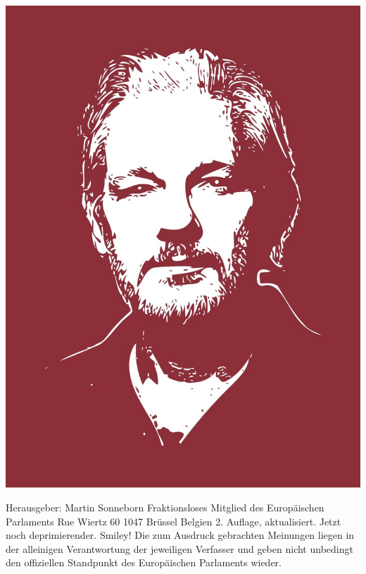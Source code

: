 \includegraphics[width=180mm]{assange.jpg}

Herausgeber:
Martin Sonneborn
Fraktionsloses Mitglied des Europäischen Parlaments
Rue Wiertz 60
1047 Brüssel
Belgien
2. Auflage, aktualisiert. Jetzt noch deprimierender. Smiley!
Die zum Ausdruck gebrachten Meinungen liegen in der alleinigen Verantwortung der jeweiligen Verfasser
und geben nicht unbedingt den offiziellen Standpunkt des Europäischen Parlaments wieder.

